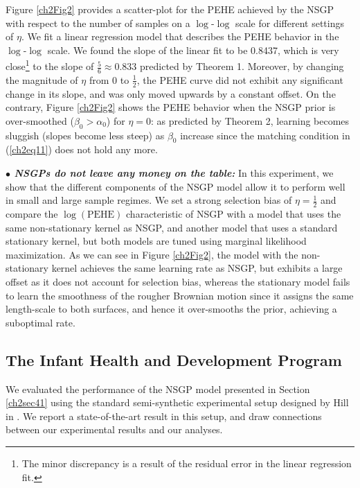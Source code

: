 \documentclass [PhD] {uclathes}
\begin{document}
Figure \ref{ch2Fig2} provides a scatter-plot for the PEHE achieved by the NSGP with respect to the number of samples on a $\log$-$\log$ scale for different settings of $\eta$. We fit a linear regression model that describes the PEHE behavior in the $\log$-$\log$ scale. We found the slope of the linear fit to be 0.8437, which is very close\footnote{The minor discrepancy is a result of the residual error in the linear regression fit.} to the slope of $\frac{5}{6} \approx 0.833$ predicted by Theorem 1. Moreover, by changing the magnitude of $\eta$ from $0$ to $\frac{1}{2}$, the PEHE curve did not exhibit any significant change in its slope, and was only moved upwards by a constant offset. On the contrary, Figure \ref{ch2Fig2} shows the PEHE behavior when the NSGP prior is over-smoothed ($\beta_0 > \alpha_0$) for $\eta=0$: as predicted by Theorem 2, learning becomes sluggish (slopes become less steep) as $\beta_0$ increase since the matching condition in (\ref{ch2eq11}) does not hold any more.     

\textbf{$\bullet$ \textit{NSGPs do not leave any money on the table:}} In this experiment, we show that the different components of the NSGP model allow it to perform well in small and large sample regimes. We set a strong selection bias of $\eta = \frac{1}{2}$ and compare the $\log(\mbox{PEHE})$ characteristic of NSGP with a model that uses the same non-stationary kernel as NSGP, and another model that uses a standard stationary kernel, but both models are tuned using marginal likelihood maximization. As we can see in Figure \ref{ch2Fig2}, the model with the non-stationary kernel achieves the same learning rate as NSGP, but exhibits a large offset as it does not account for selection bias, whereas the stationary model fails to learn the smoothness of the rougher Brownian motion since it assigns the same length-scale to both surfaces, and hence it over-smooths the prior, achieving a suboptimal rate. 

\subsection{The Infant Health and Development Program}
\label{exp2}
We evaluated the performance of the NSGP model presented in Section \ref{ch2sec41} using the standard semi-synthetic experimental setup designed by Hill in \cite{hill2011bayesian}. We report a state-of-the-art result in this setup, and draw connections between our experimental results and our analyses.
\end{document}
